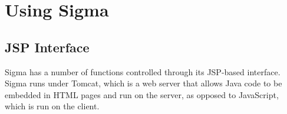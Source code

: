 \documentclass{book}
\begin{document}

\chapter{Using Sigma}
\label{chap:UsingSigma}



\section{JSP Interface}
\label{chap:KnowEngi:sec:JSPInterface}

Sigma has a number of functions controlled through its JSP-based interface.  Sigma
runs under Tomcat, which is a web server that allows Java code to be embedded in
HTML pages and run on the server, as opposed to JavaScript, which is run on the
client.
\end{document}
